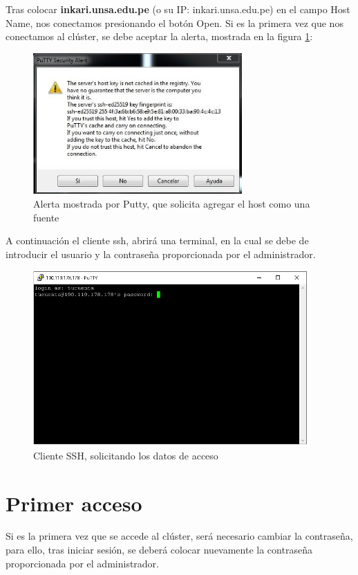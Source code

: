 \documentclass[a4paper,11pt]{article}
\begin{document}
Tras colocar \textbf{inkari.unsa.edu.pe} (o su IP: inkari.unsa.edu.pe) en el campo Host Name, nos conectamos presionando el botón Open. Si es la primera vez que nos conectamos al clúster, se debe aceptar la alerta, mostrada en la figura \ref{fig:putty_alerta}:

\begin{figure}[!ht]
    \centering
    \includegraphics[width=8cm]{putty_alerta}
    \caption{Alerta mostrada por Putty, que solicita agregar el host como una fuente}
    \label{fig:putty_alerta}
\end{figure}

A continuación el cliente ssh, abrirá una terminal, en la cual se debe de introducir el usuario y la contraseña proporcionada por el administrador.

\begin{figure}[!ht]
    \centering
    \includegraphics[width=10.5cm]{putty_terminal}
    \caption{Cliente SSH, solicitando los datos de acceso}
\end{figure}

\section{Primer acceso}

Si es la primera vez que se accede al clúster, será necesario cambiar la contraseña, para ello, tras iniciar sesión, se deberá colocar nuevamente la contraseña proporcionada por el administrador.
\end{document}
